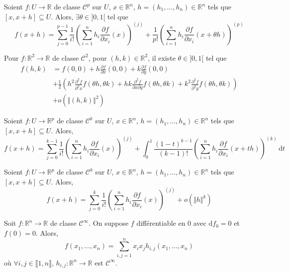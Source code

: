 	\begin{theorem}
		Soient $f : U \rightarrow \mathbb{R}$ de classe $\mathcal{C}^p$ sur $U$, $x \in \mathbb{R}^n$, $h = (h_1, \dots, h_n) \in \mathbb{R}^n$ tels que $[x,x+h] \subseteq U$. Alors, $\exists \theta \in ]0,1[$ tel que
		\[ f(x+h) = \sum_{j=0}^{p-1} \frac{1}{i!} \left( \sum_{i=1}^n h_i \frac{\partial f}{\partial x_i} (x) \right)^{(j)} + \frac{1}{p!} \left( \sum_{i=1}^n h_i \frac{\partial f}{\partial x_i} (x + \theta h) \right)^{(p)} \]
	\end{theorem}
	
	\begin{example}
		Pour $f : \mathbb{R}^2 \rightarrow \mathbb{R}$ de classe $\mathcal{C}^2$, pour $(h, k) \in \mathbb{R}^2$, il existe $\theta \in ]0,1[$ tel que
		\begin{align*}
			f(h,k) &= f(0,0) + h \frac{\partial f}{\partial x}(0,0) + k \frac{\partial f}{\partial y}(0,0) \\
			&+ \frac{1}{2} \left( h^2 \frac{\partial^2 f}{\partial^2 x} f(\theta h, \theta k) + hk \frac{\partial^2 f}{\partial x \partial y} f(\theta h, \theta k) + k^2 \frac{\partial^2 f}{\partial^2 y} f(\theta h, \theta k) \right) \\
			&+ o(\Vert (h,k) \Vert^2)
		\end{align*}
	\end{example}
	
	\begin{theorem}
		Soient $f : U \rightarrow \mathbb{R}^p$ de classe $\mathcal{C}^k$ sur $U$, $x \in \mathbb{R}^n$, $h = (h_1, \dots, h_n) \in \mathbb{R}^n$ tels que $[x,x+h] \subseteq U$. Alors,
		\[ f(x+h) = \sum_{j=0}^{k-1} \frac{1}{i!} \left( \sum_{i=1}^n h_i \frac{\partial f}{\partial x_i} (x) \right)^{(j)} + \int_0^1 \frac{(1-t)^{k-1}}{(k-1)!} \left( \sum_{i=1}^{n} h_i \frac{\partial f}{\partial x_i} (x+th) \right)^{(k)} \, \mathrm{d}t \]
	\end{theorem}
	
	\begin{theorem}
		Soient $f : U \rightarrow \mathbb{R}^p$ de classe $\mathcal{C}^k$ sur $U$, $x \in \mathbb{R}^n$, $h = (h_1, \dots, h_n) \in \mathbb{R}^n$ tels que $[x,x+h] \subseteq U$. Alors,
		\[ f(x+h) = \sum_{j=0}^{k} \frac{1}{i!} \left( \sum_{i=1}^n h_i \frac{\partial f}{\partial x_i} (x) \right)^{(j)} + o(\Vert h \Vert^k) \]
	\end{theorem}
	
	\begin{application}
		Soit $f : \mathbb{R}^n \rightarrow \mathbb{R}$ de classe $\mathcal{C}^\infty$. On suppose $f$ différentiable en $0$ avec $\mathrm{d}f_0 = 0$ et $f(0) = 0$. Alors,
		\[ f(x_1, \dots, x_n) = \sum_{i,j=1}^n x_i x_j h_{i,j}(x_1, \dots, x_n) \]
		où $\forall i,j \in \llbracket 1, n \rrbracket$, $h_{i,j} : \mathbb{R}^n \rightarrow \mathbb{R}$ est $\mathcal{C}^\infty$.
	\end{application}
	
